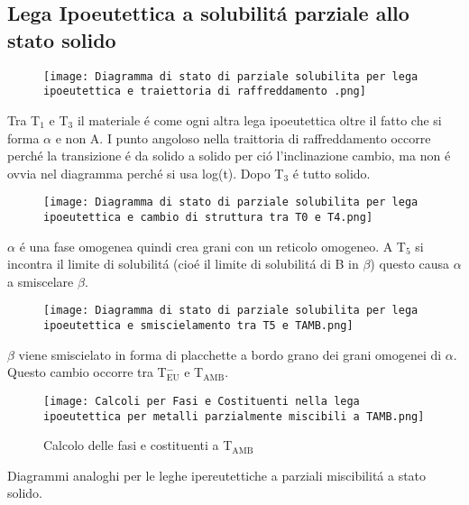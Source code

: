 \documentclass{article}
\begin{document}
{        \subsection{Lega Ipoeutettica a solubilit\'a parziale allo stato solido}
            \begin{figure}[h!]
                \centering
                \texttt{[image: Diagramma di stato di parziale solubilita per lega ipoeutettica e traiettoria di raffreddamento .png]}
            \end{figure}
            Tra T$_1$ e T$_3$ il materiale \'e come ogni altra lega ipoeutettica oltre il fatto che si forma $\alpha$ e non A. I punto angoloso nella traittoria di raffreddamento occorre perch\'e la transizione \'e da solido a solido per ci\'o l'inclinazione cambio, ma non \'e ovvia nel diagramma perch\'e si usa log(t). Dopo T$_3$ \'e tutto solido.\\
            \newpage
            \begin{figure}[h!]
                \centering
                \texttt{[image: Diagramma di stato di parziale solubilita per lega ipoeutettica e cambio di struttura tra T0 e T4.png]}
            \end{figure}
            $\alpha$ \'e una fase omogenea quindi crea grani con un reticolo omogeneo. A T$_5$ si incontra il limite di solubilit\'a (cio\'e il limite di solubilit\'a di B in $\beta$) questo causa $\alpha$ a smiscelare $\beta$.\\
            \begin{figure}[h!]
                \centering
                \texttt{[image: Diagramma di stato di parziale solubilita per lega ipoeutettica e smiscielamento tra T5 e TAMB.png]}
            \end{figure}
            $\beta$ viene smiscielato in forma di placchette a bordo grano dei grani omogenei di $\alpha$. Questo cambio occorre tra T$^-_\text{EU}$ e T$_\text{AMB}$.\\
            \begin{figure}[h!]
                \centering
                \texttt{[image: Calcoli per Fasi e Costituenti nella lega ipoeutettica per metalli parzialmente miscibili a TAMB.png]}
                \caption{Calcolo delle fasi e costituenti a T$_\text{AMB}$}
            \end{figure}
            Diagrammi analoghi per le leghe ipereutettiche a parziali miscibilit\'a a stato solido.\\
}
\end{document}
